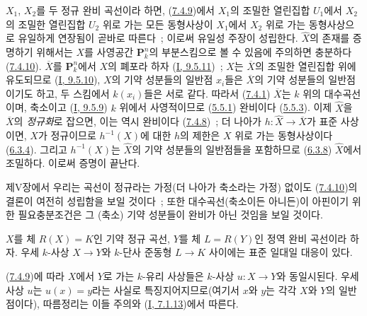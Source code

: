 $X_1$, $X_2$를 두 정규 완비 곡선이라 하면,
(\hyperref[II.7.4.9-ko]{7.4.9})에서 $X_1$의 조밀한 열린집합 $U_1$에서
$X_2$의 조밀한 열린집합 $U_2$ 위로 가는 모든 동형사상이 $X_1$에서
$X_2$ 위로 가는 동형사상으로 유일하게 연장됨이 곧바로 따른다~;
이로써 유일성 주장이 성립한다. $\widehat{X}$의 존재를 증명하기 위해서는
$X$를 사영공간 $\mathbf{P}_k^n$의 부분스킴으로 볼 수 있음에 주의하면
충분하다 (\hyperref[II.7.4.10-ko]{7.4.10}). $\overline{X}$를
$\mathbf{P}_k^n$에서 $X$의 폐포라 하자
(\hyperref[I.9.5.11-ko]{I, 9.5.11})~; $X$는 $\overline{X}$의 조밀한
열린집합 위에 유도되므로 (\hyperref[I.9.5.10-ko]{I, 9.5.10}), $X$의
기약 성분들의 일반점 $x_i$들은 $\overline{X}$의 기약 성분들의
일반점이기도 하고, 두 스킴에서 $k(x_i)$들은 서로 같다. 따라서
(\hyperref[II.7.4.1-ko]{7.4.1}) $\overline{X}$는 $k$ 위의
대수곡선이며, 축소이고 (\hyperref[I.9.5.9-ko]{I, 9.5.9}) $k$ 위에서
사영적이므로 (\hyperref[II.5.5.1-ko]{5.5.1}) 완비이다
(\hyperref[II.5.5.3-ko]{5.5.3}). 이제 $\widehat{X}$을
$\overline{X}$의 \emph{정규화}로 잡으면, 이는 역시 완비이다
(\hyperref[II.7.4.8-ko]{7.4.8})~; 더 나아가
$h:\widehat{X}\to\overline{X}$가 표준 사상이면, $X$가 정규이므로
$h^{-1}(X)$에 대한 $h$의 제한은 $X$ 위로 가는 동형사상이다
(\hyperref[II.6.3.4-ko]{6.3.4}). 그리고 $h^{-1}(X)$는
$\widehat{X}$의 기약 성분들의 일반점들을 포함하므로
(\hyperref[II.6.3.8-ko]{6.3.8}) $\widehat{X}$에서 조밀하다. 이로써
증명이 끝난다.


\begin{remark}[7.4.12]
\label{II.7.4.12-ko}
제V장에서 우리는 곡선이 정규라는 가정(더 나아가 축소라는 가정) 없이도
(\hyperref[II.7.4.10-ko]{7.4.10})의 결론이 여전히 성립함을 보일
것이다~; 또한 대수곡선(축소이든 아니든)이 아핀이기 위한 필요충분조건은
그 (축소) 기약 성분들이 완비가 아닌 것임을 보일 것이다.
\end{remark}

\begin{corollary}[7.4.13]
\label{II.7.4.13-ko}
$X$를 체 $R(X)=K$인 기약 정규 곡선, $Y$를 체 $L=R(Y)$인 정역 완비
곡선이라 하자. 우세 $k$-사상 $X\to Y$와 $k$-단사 준동형 $L\to K$
사이에는 표준 일대일 대응이 있다.
\end{corollary}

(\hyperref[II.7.4.9-ko]{7.4.9})에 따라 $X$에서 $Y$로 가는
$k$-유리 사상들은 $k$-사상 $u:X\to Y$와 동일시된다. 우세 사상 $u$는
$u(x)=y$라는 사실로 특징지어지므로(여기서 $x$와 $y$는 각각 $X$와
$Y$의 일반점이다), 따름정리는 이들 주의와
(\hyperref[I.7.1.13-ko]{I, 7.1.13})에서 따른다.

